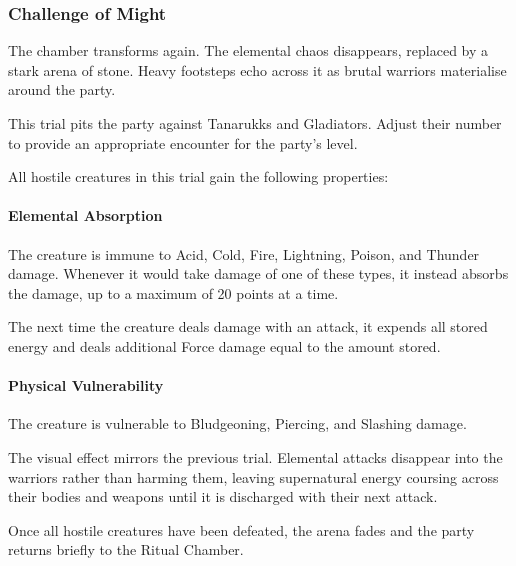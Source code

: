 \subsubsection*{Challenge of Might}
{\entryfont The chamber transforms again. The elemental chaos disappears, replaced by a stark arena of stone. Heavy footsteps echo across it as brutal warriors materialise around the party.

This trial pits the party against Tanarukks and Gladiators. Adjust their number to provide an appropriate encounter for the party's level.

All hostile creatures in this trial gain the following properties:

\paragraph*{Elemental Absorption} The creature is immune to Acid, Cold, Fire, Lightning, Poison, and Thunder damage. Whenever it would take damage of one of these types, it instead absorbs the damage, up to a maximum of 20 points at a time.

The next time the creature deals damage with an attack, it expends all stored energy and deals additional Force damage equal to the amount stored.

\paragraph*{Physical Vulnerability} The creature is vulnerable to Bludgeoning, Piercing, and Slashing damage.

The visual effect mirrors the previous trial. Elemental attacks disappear into the warriors rather than harming them, leaving supernatural energy coursing across their bodies and weapons until it is discharged with their next attack.

Once all hostile creatures have been defeated, the arena fades and the party returns briefly to the Ritual Chamber.}

